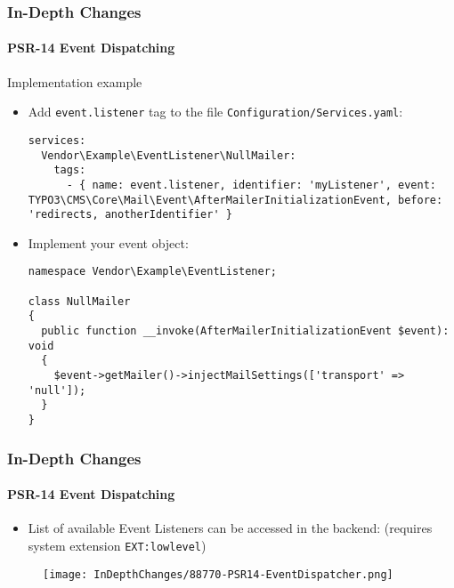 \begin{frame}[fragile]
	\frametitle{In-Depth Changes}
	\framesubtitle{PSR-14 Event Dispatching}

	\lstset{basicstyle=\tiny\ttfamily}

	Implementation example

	\begin{itemize}\smaller
		\item[\ding{202}] Add \texttt{event.listener} tag to the file \texttt{Configuration/Services.yaml}:
\begin{lstlisting}
services:
  Vendor\Example\EventListener\NullMailer:
    tags:
      - { name: event.listener, identifier: 'myListener', event: TYPO3\CMS\Core\Mail\Event\AfterMailerInitializationEvent, before: 'redirects, anotherIdentifier' }
\end{lstlisting}

		\item[\ding{203}] Implement your event object:
\begin{lstlisting}
namespace Vendor\Example\EventListener;

class NullMailer
{
  public function __invoke(AfterMailerInitializationEvent $event): void
  {
    $event->getMailer()->injectMailSettings(['transport' => 'null']);
  }
}
\end{lstlisting}

	\end{itemize}\normalsize

\end{frame}


\begin{frame}[fragile]
	\frametitle{In-Depth Changes}
	\framesubtitle{PSR-14 Event Dispatching}

	\lstset{basicstyle=\tiny\ttfamily}

	\begin{itemize}
		\item List of available Event Listeners can be accessed in the backend:\newline
			\smaller
				(requires system extension \texttt{EXT:lowlevel})
			\normalsize
	\end{itemize}

	\begin{figure}
		\texttt{[image: InDepthChanges/88770-PSR14-EventDispatcher.png]}
	\end{figure}

\end{frame}

